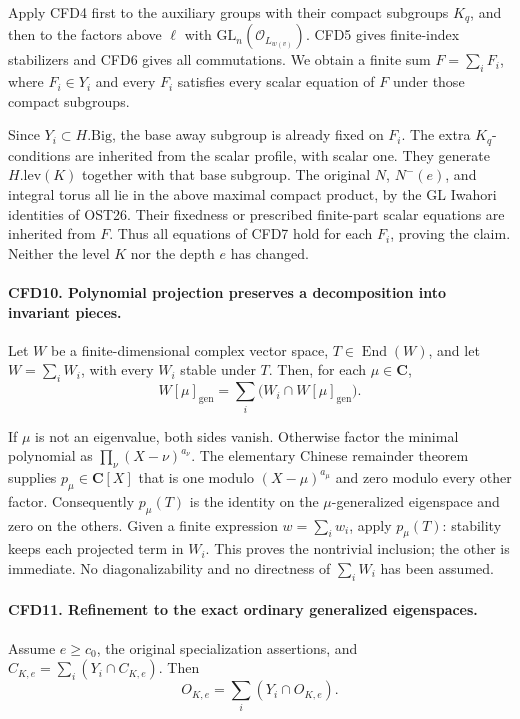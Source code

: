 \documentclass[11pt,a4paper]{article}
\numberwithin{equation}{section}
\theoremstyle{remark}\newtheorem{remark}[theorem]{Remark}
\begin{document}
Apply CFD4 first to the auxiliary groups with their compact subgroups
\(K_q\), and then to the factors above \(\ell\) with
\(\mathrm{GL}_n(\mathcal O_{L_{w(v)}})\).  CFD5 gives finite-index
stabilizers and CFD6 gives all commutations.  We obtain a finite sum
\(F=\sum_iF_i\), where \(F_i\in Y_i\) and every \(F_i\) satisfies
every scalar equation of \(F\) under those compact subgroups.

Since \(Y_i\subset H.\mathrm{Big}\), the base away subgroup is already
fixed on \(F_i\).  The extra \(K_q\)-conditions are inherited from
the scalar profile, with scalar one.  They generate
\(H.\mathrm{lev}(K)\) together with that base subgroup.  The original
\(N\), \(N^-(e)\), and integral torus all lie in the above maximal
compact product, by the GL Iwahori identities of OST26.  Their fixedness
or prescribed finite-part scalar equations are inherited from \(F\).
Thus all equations of CFD7 hold for each \(F_i\), proving the claim.
Neither the level \(K\) nor the depth \(e\) has changed.

\paragraph{CFD10. Polynomial projection preserves a decomposition into invariant pieces.}
\label{claim:CFD10}
Let \(W\) be a finite-dimensional complex vector space, \(T\in
\operatorname{End}(W)\), and let \(W=\sum_iW_i\), with every
\(W_i\) stable under \(T\).  Then, for each \(\mu\in\mathbf C\),
\[
 W[\mu]_{\mathrm{gen}}
       =\sum_i\bigl(W_i\cap W[\mu]_{\mathrm{gen}}\bigr).
\]

If \(\mu\) is not an eigenvalue, both sides vanish.  Otherwise factor
the minimal polynomial as \(\prod_\nu(X-\nu)^{a_\nu}\).  The elementary
Chinese remainder theorem supplies \(p_\mu\in\mathbf C[X]\) that is one
modulo \((X-\mu)^{a_\mu}\) and zero modulo every other factor.
Consequently \(p_\mu(T)\) is the identity on the \(\mu\)-generalized
eigenspace and zero on the others.  Given a finite expression
\(w=\sum_iw_i\), apply \(p_\mu(T)\): stability keeps each projected
term in \(W_i\).  This proves the nontrivial inclusion; the other is
immediate.  No diagonalizability and no directness of \(\sum_iW_i\)
has been assumed.

\paragraph{CFD11. Refinement to the exact ordinary generalized eigenspaces.}
\label{claim:CFD11}
Assume \(e\ge c_0\), the original specialization assertions, and
\(C_{K,e}=\sum_i(Y_i\cap C_{K,e})\).  Then
\[
                         O_{K,e}=\sum_i(Y_i\cap O_{K,e}).
\]
\end{document}
